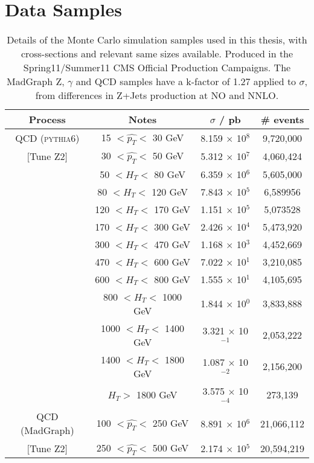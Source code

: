 \chapter{Data Samples}
\begin{table}[htbp]
\caption{\label{}Details of the Monte Carlo simulation samples used in this thesis, with cross-sections and relevant same sizes available. Produced in the Spring11/Summer11 CMS Official Production Campaigns. The MadGraph Z, $\gamma$ and QCD samples have a k-factor of 1.27 applied to $\sigma$, from differences in Z+Jets production at NO and NNLO.}
\begin{tabular}{cccc}
\hline
\hline
Process & Notes & $\sigma$ / pb & \# events\\
\hline
\hline
QCD (\textsc{pythia6}) & 15 $< \hat{p_{T}} <$ 30 GeV & 8.159 $\times$ 10$^{8}$ & 9,720,000 \\ 
$[$Tune Z2$]$ & 30 $< \hat{p_{T}} <$ 50 GeV & 5.312 $\times$ 10$^{7}$ & 4,060,424\\ 
& 50 $< H_{T} <$ 80 GeV & 6.359 $\times$ 10$^{6}$ & 5,605,000\\ 
& 80 $< H_{T} <$ 120 GeV & 7.843 $\times$ 10$^{5}$ & 6,589956\\ 
& 120 $< H_{T} <$ 170 GeV & 1.151 $\times$ 10$^{5}$ & 5,073528\\ 
& 170 $< H_{T} <$ 300 GeV & 2.426 $\times$ 10$^{4}$ & 5,473,920 \\ 
& 300 $< H_{T} <$ 470 GeV & 1.168 $\times$ 10$^{3}$ & 4,452,669\\ 
& 470 $< H_{T} <$ 600 GeV & 7.022 $\times$ 10$^{1}$ & 3,210,085\\ 
& 600 $< H_{T} <$ 800 GeV & 1.555 $\times$ 10$^{1}$ & 4,105,695\\ 
& 800 $< H_{T} <$ 1000 GeV & 1.844 $\times$ 10$^{0}$ & 3,833,888\\ 
& 1000 $< H_{T} <$ 1400 GeV & 3.321 $\times$ 10$^{-1}$ & 2,053,222\\
& 1400 $< H_{T} <$ 1800 GeV & 1.087 $\times$ 10$^{-2}$ & 2,156,200\\  
& $H_{T} >$ 1800 GeV & 3.575 $\times$ 10$^{-4}$ & 273,139\\ 
\hline
\hline
QCD (MadGraph) & 100 $< \hat{p_{T}} <$ 250 GeV & 8.891 $\times$ 10$^{6}$ & 21,066,112 \\
$[$Tune Z2$]$ & 250 $< \hat{p_{T}} <$ 500 GeV & 2.174 $\times$ 10$^{5}$ & 20,594,219 \\ 

\end{tabular}
\end{table}
